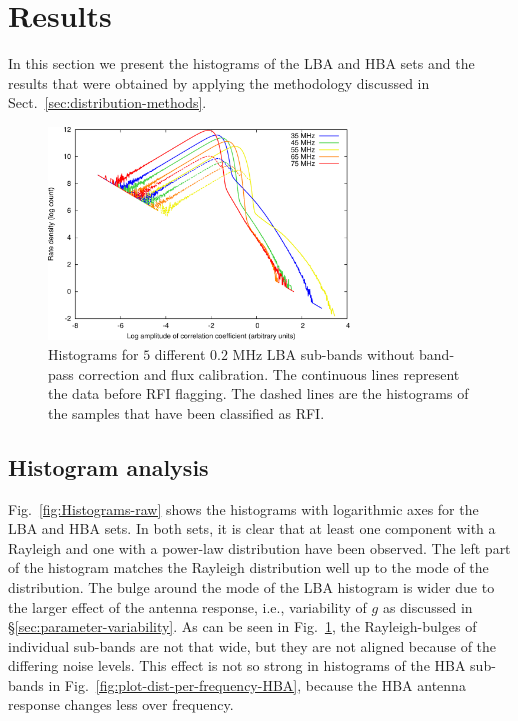 \documentclass[useAMS,usenatbib]{mn2e}
\begin{document}
\section{Results} \label{sec:dist-results}
In this section we present the histograms of the LBA and HBA sets and the results that were obtained by applying the methodology discussed in Sect.~\ref{sec:distribution-methods}. 

\begin{figure}
\begin{center}
\includegraphics[width=8cm]{img/plot-lba-dist-per-frequency-trimmed}
\caption{Histograms for $5$ different $0.2$ MHz LBA sub-bands without band-pass correction and flux calibration. The continuous lines represent the data before RFI flagging. The dashed lines are the histograms of the samples that have been classified as RFI.}
\label{fig:plot-dist-per-frequency-LBA}
\end{center}
\end{figure}

\subsection{Histogram analysis}
Fig.~\ref{fig:Histograms-raw} shows the histograms with logarithmic axes for the LBA and HBA sets. In both sets, it is clear that at least one component with a Rayleigh and one with a power-law distribution have been observed. The left part of the histogram matches the Rayleigh distribution well up to the mode of the distribution. The bulge around the mode of the LBA histogram is wider due to the larger effect of the antenna response, i.e., variability of $g$ as discussed in \S\ref{sec:parameter-variability}. As can be seen in Fig.~\ref{fig:plot-dist-per-frequency-LBA}, the Rayleigh-bulges of individual sub-bands are not that wide, but they are not aligned because of the differing noise levels. This effect is not so strong in histograms of the HBA sub-bands in Fig.~\ref{fig:plot-dist-per-frequency-HBA}, because the HBA antenna response changes less over frequency.
\end{document}
